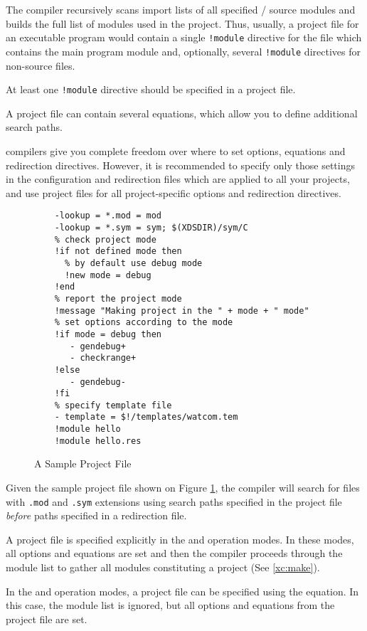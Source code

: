 The compiler recursively scans import lists of all
specified \mt{}/\ot{} source modules and builds the full list of modules used
in the project. Thus, usually, a project file for an executable program
would contain a single {\tt !module} directive for the file which
contains the main program module and, optionally, several {\tt !module}
directives for non-source files.

At least one \verb'!module' directive should be specified in a project file.

A project file can contain several  equations, which
allow you to define additional search paths.

\xds{} compilers give you complete freedom over where to set options, equations
and redirection directives. However, it is recommended to specify
only those settings in the configuration and redirection files
which are applied to all your projects, and use project files
for all project-specific options and redirection directives.

\begin{figure}[htb]
\begin{verbatim}
    -lookup = *.mod = mod
    -lookup = *.sym = sym; $(XDSDIR)/sym/C
    % check project mode
    !if not defined mode then
      % by default use debug mode
      !new mode = debug
    !end
    % report the project mode
    !message "Making project in the " + mode + " mode"
    % set options according to the mode
    !if mode = debug then
       - gendebug+
       - checkrange+
    !else
       - gendebug-
    !fi
    % specify template file
    - template = $!/templates/watcom.tem
    !module hello
    !module hello.res
\end{verbatim}
\caption{A Sample Project File}
\label{xc:project:sample}
\end{figure}

Given the sample project file shown on Figure \ref{xc:project:sample},
the compiler will search for files with \verb'.mod'
and \verb'.sym' extensions using search paths specified in the
project file {\it before} paths specified in a redirection file.

A project file is specified explicitly in the 
and  operation modes. In these modes, all
options and equations are set and then the compiler proceeds through
the module list to gather all modules constituting a project (See \ref{xc:make}).

In the  and 
operation modes, a project file can be specified using the 
equation. In this case, the module list is ignored, but all options
and equations from the project file are set.

